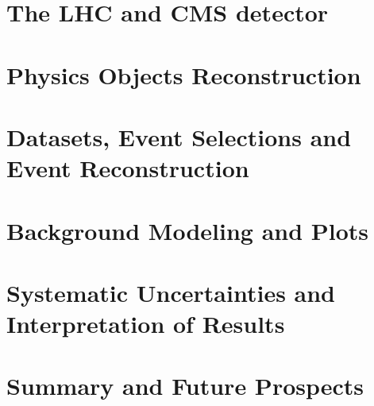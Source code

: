 \documentclass[14pt,a4paper,oldfontcommands]{memoir}
\begin{document}
\chapter{The LHC and CMS detector}

\chapter{Physics Objects Reconstruction}

\chapter{Datasets, Event Selections and Event Reconstruction}


\chapter{Background Modeling and Plots}

\chapter{Systematic Uncertainties and Interpretation of Results}

\chapter{Summary and Future Prospects}





\end{document}
